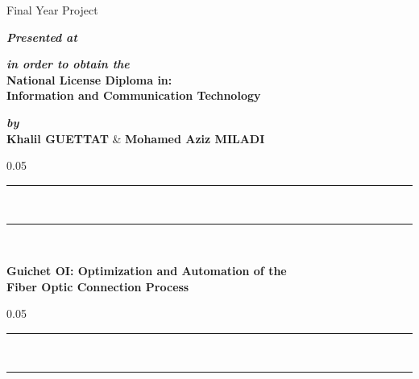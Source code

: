 \begin{titlepage}
\begin{center}

\vspace{10pt} {%
  \renewcommand*{\familydefault}{\defaultFont}
  \fontsize{36pt}{36pt}\selectfont%
  Final Year Project\\%
}

\vspace{30pt}%
\textbf{\textit{Presented at}}\\


\vspace{20pt}
\textbf{\textit{in order to obtain the}}\\

\vspace{10pt}
\renewcommand*{\familydefault}{\defaultFont}
\fontsize{14pt}{14pt}\selectfont%
\textbf{%
National License Diploma in:\\
Information and Communication Technology\\
}

\vspace{50pt}
\textbf{\textit{by}}\\
\vspace{10pt} {%
  \fontsize{18pt}{18pt}\selectfont%
  \textbf{Khalil GUETTAT} \& \textbf{Mohamed Aziz MILADI}\\
}%

\vspace{20pt} {%
  \begin{spacing}{0.05}
    \rule{200pt}{2pt}\\
    \rule{200pt}{0.75pt}\\
  \end{spacing}
  \renewcommand*{\familydefault}{\defaultFont}
  \fontsize{17pt}{17pt}\selectfont%
  \vspace{20pt}
  \textbf{
  Guichet OI: Optimization and Automation of the\\ 
  Fiber Optic Connection Process\\%
  }
  \vspace{10pt}
  \begin{spacing}{0.05}
    \rule{200pt}{0.75pt}\\
    \rule{200pt}{2pt}\\
  \end{spacing}
}


\end{center}
\end{titlepage}

